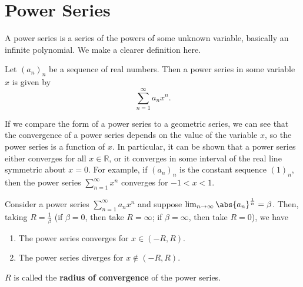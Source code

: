 \documentclass[../real_analysis.tex]{subfiles}
\begin{document}
    \section{Power Series}
        A power series is a series of the powers of some unknown variable, basically an infinite polynomial. We make a clearer definition here.
        \begin{definition}
            Let $(a_n)_n$ be a sequence of real numbers. Then a power series in some variable $x$ is given by
            \begin{equation}
                \sum_{n=1}^\infty a_nx^n.
            \end{equation}
        \end{definition}
        If we compare the form of a power series to a geometric series, we can see that the convergence of a power series depends on the value of the variable $x$, so the power series is a function of $x$. In particular, it can be shown that a power series either converges for all $x\in\mathbb{R}$, or it converges in some interval of the real line symmetric about $x=0$. For example, if $(a_n)_n$ is the constant sequence $(1)_n$, then the power series $\sum_{n=1}^\infty x^n$ converges for $-1<x<1$.
        \begin{theorem}
            Consider a power series $\sum_{n=1}^\infty a_nx^n$ and suppose $\lim_{n\to\infty}\abs{a_n}^\frac{1}{n}=\beta$. Then, taking $R=\frac{1}{\beta}$ (if $\beta=0$, then take $R=\infty$; if $\beta=\infty$, then take $R=0$), we have
            \begin{enumerate}[label={\upshape(\roman*)}]
                \item The power series converges for $x\in(-R, R)$.
                \item The power series diverges for $x\notin(-R, R)$.
            \end{enumerate}
            $R$ is called the \textbf{radius of convergence} of the power series.
        \end{theorem}
\end{document}
